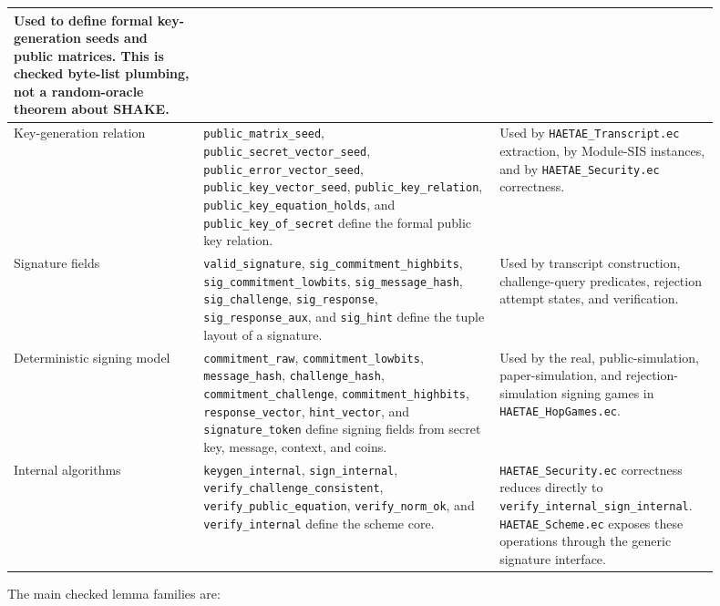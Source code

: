 \documentclass[11pt]{report}
\DeclareRobustCommand{\file}[1]{\ifmmode\text{\nolinkurl{#1}}\else\nolinkurl{#1}\fi}
\DeclareRobustCommand{\ec}[1]{\ifmmode\text{\nolinkurl{#1}}\else\nolinkurl{#1}\fi}
\theoremstyle{definition}
\theoremstyle{plain}
\begin{document}
\begin{longtable}{p{0.25\linewidth}p{0.39\linewidth}p{0.26\linewidth}}
Used to define formal key-generation seeds and public matrices.  This is
checked byte-list plumbing, not a random-oracle theorem about SHAKE. \\
\midrule
Key-generation relation &
\ec{public\_matrix\_seed}, \ec{public\_secret\_vector\_seed},
\ec{public\_error\_vector\_seed}, \ec{public\_key\_vector\_seed},
\ec{public\_key\_relation}, \ec{public\_key\_equation\_holds}, and
\ec{public\_key\_of\_secret} define the formal public key relation. &
Used by \file{HAETAE\_Transcript.ec} extraction, by Module-SIS instances, and
by \file{HAETAE\_Security.ec} correctness. \\
\midrule
Signature fields &
\ec{valid\_signature}, \ec{sig\_commitment\_highbits},
\ec{sig\_commitment\_lowbits}, \ec{sig\_message\_hash},
\ec{sig\_challenge}, \ec{sig\_response}, \ec{sig\_response\_aux}, and
\ec{sig\_hint} define the tuple layout of a signature. &
Used by transcript construction, challenge-query predicates, rejection
attempt states, and verification. \\
\midrule
Deterministic signing model &
\ec{commitment\_raw}, \ec{commitment\_lowbits}, \ec{message\_hash},
\ec{challenge\_hash}, \ec{commitment\_challenge},
\ec{commitment\_highbits}, \ec{response\_vector}, \ec{hint\_vector}, and
\ec{signature\_token} define signing fields from secret key, message, context,
and coins. &
Used by the real, public-simulation, paper-simulation, and rejection-simulation
signing games in \file{HAETAE\_HopGames.ec}. \\
\midrule
Internal algorithms &
\ec{keygen\_internal}, \ec{sign\_internal},
\ec{verify\_challenge\_consistent}, \ec{verify\_public\_equation},
\ec{verify\_norm\_ok}, and \ec{verify\_internal} define the scheme core. &
\ec{HAETAE\_Security.ec} correctness reduces directly to
\ec{verify\_internal\_sign\_internal}.  \file{HAETAE\_Scheme.ec} exposes these
operations through the generic signature interface. \\
\bottomrule
\end{longtable}

The main checked lemma families are:
\end{document}
